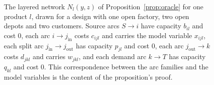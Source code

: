 \begin{figure}[H]
{%
  }
  \caption{The layered network $N_l(y,z)$ of
  Proposition~\ref{prop:oracle} for one product $l$, drawn for a design
  with one open factory, two open depots and two customers. Source arcs
  $S\to i$ have capacity $b_{il}$ and cost $0$, each arc
  $i\to j_{\mathrm{in}}$ costs $c_{ijl}$ and carries the model variable
  $x_{ijl}$, each split arc $j_{\mathrm{in}}\to j_{\mathrm{out}}$ has
  capacity $p_{jl}$ and cost $0$, each arc $j_{\mathrm{out}}\to k$ costs
  $d_{jkl}$ and carries $w_{jkl}$, and each demand arc $k\to T$ has
  capacity $q_{kl}$ and cost $0$. This correspondence between the arc
  families and the model variables is the content of the proposition's
  proof.}
  \label{fig:oraclenet}
\end{figure}

